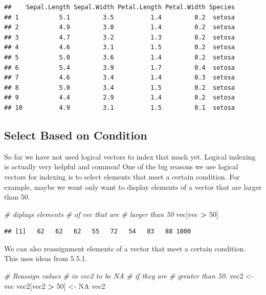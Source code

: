 \documentclass[
]{book}
\newenvironment{Shaded}{\begin{snugshade}}{\end{snugshade}}
\newcommand{\CommentTok}[1]{\textcolor[rgb]{0.56,0.35,0.01}{\textit{#1}}}
\newcommand{\DecValTok}[1]{\textcolor[rgb]{0.00,0.00,0.81}{#1}}
\newcommand{\NormalTok}[1]{#1}
\newcommand{\OperatorTok}[1]{\textcolor[rgb]{0.81,0.36,0.00}{\textbf{#1}}}
\newcommand{\OtherTok}[1]{\textcolor[rgb]{0.56,0.35,0.01}{#1}}
\newcommand{\StringTok}[1]{\textcolor[rgb]{0.31,0.60,0.02}{#1}}
\begin{document}
\begin{verbatim}
##    Sepal.Length Sepal.Width Petal.Length Petal.Width Species
## 1           5.1         3.5          1.4         0.2  setosa
## 2           4.9         3.0          1.4         0.2  setosa
## 3           4.7         3.2          1.3         0.2  setosa
## 4           4.6         3.1          1.5         0.2  setosa
## 5           5.0         3.6          1.4         0.2  setosa
## 6           5.4         3.9          1.7         0.4  setosa
## 7           4.6         3.4          1.4         0.3  setosa
## 8           5.0         3.4          1.5         0.2  setosa
## 9           4.4         2.9          1.4         0.2  setosa
## 10          4.9         3.1          1.5         0.1  setosa
\end{verbatim}

\hypertarget{select-based-on-condition}{%
\subsection{Select Based on Condition}\label{select-based-on-condition}}

So far we have not used logical vectors to index that much yet. Logical indexing is actually very helpful and common! One of the big reasons we use logical vectors for indexing is to select elements that meet a certain condition. For example, maybe we want only want to display elements of a vector that are larger than 50.

\begin{Shaded}
\begin{Highlighting}[]
\CommentTok{# diplays elements}
\CommentTok{# of vec that are}
\CommentTok{# larger than 50}
\NormalTok{vec[vec }\OperatorTok{>}\StringTok{ }\DecValTok{50}\NormalTok{]}
\end{Highlighting}
\end{Shaded}

\begin{verbatim}
## [1]   62   62   62   55   72   54   83   88 1000
\end{verbatim}

We can also reassignment elements of a vector that meet a certain condition. This uses ideas from 5.5.1.

\begin{Shaded}
\begin{Highlighting}[]
\CommentTok{# Reassign values}
\CommentTok{# in vec2 to be NA}
\CommentTok{# if they are}
\CommentTok{# greater than 50.}
\NormalTok{vec2 <-}\StringTok{ }\NormalTok{vec}
\NormalTok{vec2[vec2 }\OperatorTok{>}\StringTok{ }\DecValTok{50}\NormalTok{] <-}\StringTok{ }\OtherTok{NA}
\NormalTok{vec2}
\end{Highlighting}
\end{Shaded}
\end{document}
